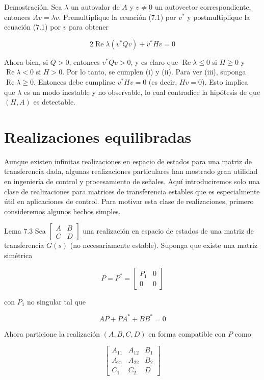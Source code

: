 Demostración. Sea $\lambda$ un autovalor de $A$ y $v \neq 0$ un autovector correspondiente, entonces $A v=\lambda v$. Premultiplique la ecuación (7.1) por $v^{*}$ y postmultiplique la ecuación (7.1) por $v$ para obtener

$$
2 \operatorname{Re} \lambda\left(v^{*} Q v\right)+v^{*} H v=0
$$

Ahora bien, si $Q>0$, entonces $v^{*} Q v>0$, y es claro que $\operatorname{Re} \lambda \leq 0$ si $H \geq 0$ y $\operatorname{Re} \lambda<0$ si $H>0$. Por lo tanto, se cumplen (i) y (ii). Para ver (iii), suponga $\operatorname{Re}\lambda \geq 0$. Entonces debe cumplirse $v^{*} H v=0$ (es decir, $H v=0$). Esto implica que $\lambda$ es un modo inestable y no observable, lo cual contradice la hipótesis de que $(H, A)$ es detectable.

\section{Realizaciones equilibradas}
Aunque existen infinitas realizaciones en espacio de estados para una matriz de transferencia dada, algunas realizaciones particulares han mostrado gran utilidad en ingeniería de control y procesamiento de señales. Aquí introduciremos solo una clase de realizaciones para matrices de transferencia estables que es especialmente útil en aplicaciones de control. Para motivar esta clase de realizaciones, primero consideremos algunos hechos simples.

Lema 7.3 Sea $\left[\begin{array}{c|c}A & B \\ \hline C & D\end{array}\right]$ una realización en espacio de estados de una matriz de transferencia $G(s)$ (no necesariamente estable). Suponga que existe una matriz simétrica

$$
P=P^{*}=\left[\begin{array}{cc}
P_{1} & 0 \\
0 & 0
\end{array}\right]
$$

con $P_{1}$ no singular tal que

$$
A P+P A^{*}+B B^{*}=0
$$

Ahora particione la realización $(A, B, C, D)$ en forma compatible con $P$ como

$$
\left[\begin{array}{cc|c}
A_{11} & A_{12} & B_{1} \\
A_{21} & A_{22} & B_{2} \\
\hline C_{1} & C_{2} & D
\end{array}\right]
$$

